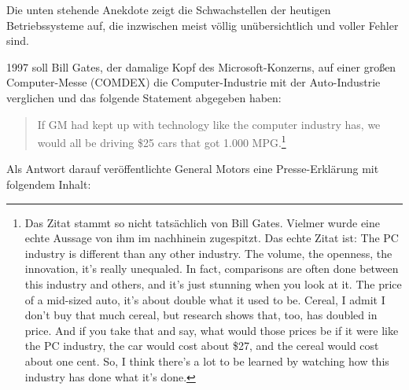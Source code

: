 Die unten stehende Anekdote zeigt die Schwachstellen der heutigen
Betriebssysteme auf, die inzwischen meist völlig unübersichtlich und voller
Fehler sind.

1997 soll Bill Gates, der damalige Kopf des Microsoft-Konzerns, auf einer großen
Computer-Messe (COMDEX) die Computer-Industrie mit der Auto-Industrie
verglichen und das folgende Statement abgegeben haben:

\begin{quotation}
\noindent If GM had kept up with technology like the computer industry has, we
would all be driving \$25 cars that got 1.000 MPG.\footnote{Das Zitat
stammt so nicht tatsächlich von Bill Gates. Vielmer wurde eine echte Aussage
von ihm im nachhinein zugespitzt. Das echte Zitat ist: \glqq The PC industry is
different than any other industry. The volume, the openness, the innovation,
it's really unequaled. In fact, comparisons are often done between this
industry and others, and it's just stunning when you look at it. The price of a
mid-sized auto, it's about double what it used to be. Cereal, I admit I don't
buy that much cereal, but research shows that, too, has doubled in price. And
if you take that and say, what would those prices be if it were like the PC
industry, the car would cost about \$27, and the cereal would cost about one
cent. So, I think there's a lot to be learned by watching how this industry has
done what it's done.\grqq}
\end{quotation}


Als Antwort darauf veröffentlichte General Motors eine Presse-Erklärung mit
folgendem Inhalt:

